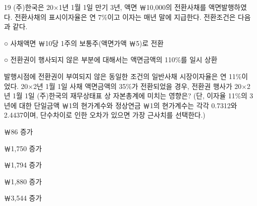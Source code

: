 \begin{question}{19}
(주)한국은 20×1년 1월 1일 만기 3년, 액면 ￦10,000의 전환사채를 액면발행하였다. 전환사채의 표시이자율은 연 7\%이고 이자는 매년 말에 지급한다. 전환조건은 다음과 같다.
\begin{framedtext}
○ 사채액면 ￦10당 1주의 보통주(액면가액 ￦5)로 전환 \par
○ 전환권이 행사되지 않은 부분에 대해서는 액면금액의 110\%를 일시 상환 \par
\end{framedtext}
발행시점에 전환권이 부여되지 않은 동일한 조건의 일반사채 시장이자율은 연 11\%이었다. 20×2년 1월 1일 사채 액면금액의 35\%가 전환되었을 경우, 전환권 행사가 20×2년 1월 1일 (주)한국의 재무상태표 상 자본총계에 미치는 영향은? (단, 이자율 11\%의 3년에 대한 단일금액 ￦1의 현가계수와 정상연금 ￦1의 현가계수는 각각 0.7312와 2.4437이며, 단수차이로 인한 오차가 있으면 가장 근사치를 선택한다.) \par
\begin{choices}
  \item ￦86 증가
  \item ￦1,750 증가
  \item ￦1,794 증가
  \item ￦1,880 증가
  \item ￦3,544 증가
\end{choices}
\end{question}
